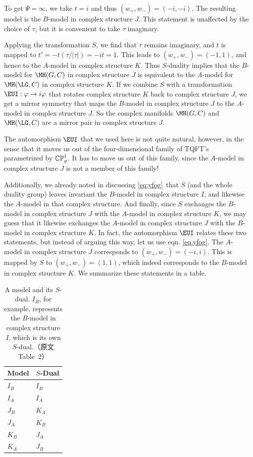 To get $\Psi=\infty$, we take $t=i$ and thus $(w_+,w_-)=(-i,-i)$.  The resulting model
is the $B$-model in complex structure $J$.  This
statement is unaffected by the choice of $\tau$, but it is
convenient to take $\tau$ imaginary.

Applying the transformation $S$, we find that $\tau$ remains
imaginary, and $t$ is mapped to $t'=-t ({ \tau}/|\tau|)=-it=1$.
This leads to $(w_+,w_-)=(-1,1)$, and hence to the $A$-model in
complex structure $K$.  Thus $S$-duality implies that the
$B$-model for $\MH(G,C)$ in complex structure $J$ is equivalent to
the $A$-model for $\MH(\LG,C)$ in complex structure $K$. If we
combine $S$ with a transformation ${\EUI}:\varphi\to i\varphi$
that rotates complex structure $K$ back to complex structure $J$,
we get a mirror symmetry that maps the $B$-model in complex
structure $J$ to the $A$-model in complex structure $J$.  So the
complex manifolds $\MH(G,C)$ and $\MH(\LG,C)$ are a mirror pair in
complex structure $J$.

The automorphism ${\EUI}$ that we used here is not quite natural,
however, in the sense that it moves us out of the four-dimensional
family of TQFT's parametrized by $\Bbb{CP}^1_g$. It has to move us
out of this family, since the $A$-model in complex structure $J$
is not a member of this family!

Additionally, we already noted in discussing \eqref{eq:yfog}\ that $S$ (and
the whole duality group) leaves invariant the $B$-model in complex
structure $I$, and likewise the $A$-model in that complex
structure.  And finally, since $S$ exchanges the $B$-model in
complex structure $J$ with the $A$-model in complex structure $K$,
we may guess that it likewise exchanges the $A$-model in complex
structure $J$ with the $B$-model in complex structure $K$. In
fact, the automorphism ${\EUI}$ relates these two statements, but
instead of arguing this way, let us use eqn. \eqref{eq:yfog}.  The $A$-model
in complex structure $J$ corresponds to $(w_+,w_-)=(-i,i)$.  This
is mapped by $S$ to $(w_+,w_-)=(1,1)$, which indeed corresponds to
the $B$-model in complex structure $K$. We summarize these
statements in a table.

\par\medskip

\begin{table}[htbp]
\centering
\begin{tabular}{ll}
\toprule
Model & $S$-Dual \\
\midrule
$I_B$ & $I_B$ \\
$I_A$ & $I_A$ \\
$J_B$ & $K_A$ \\
$J_A$ & $K_B$ \\
$K_B$ & $J_A$ \\
$K_A$ & $J_B$ \\
\bottomrule
\end{tabular}
\caption{A model and its $S$-dual.  $I_B$, for example, represents the $B$-model in complex structure $I$, which is its own $S$-dual.（原文 Table~2）}
\label{tab:sdual-models}
\end{table}
